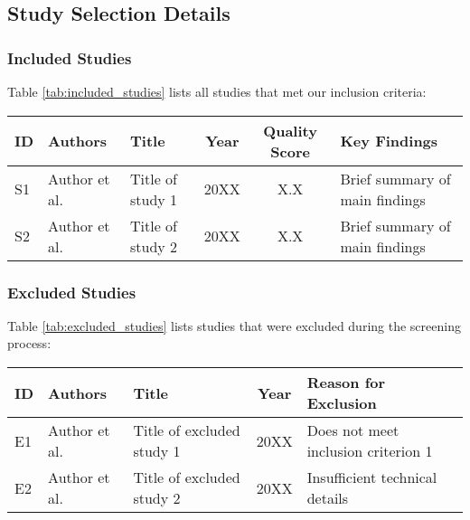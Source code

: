 \subsection{Study Selection Details}
\label{sec:study_selection}

\subsubsection{Included Studies}
Table \ref{tab:included_studies} lists all studies that met our inclusion criteria:

\begin{table*}[htbp!]
    \centering
    \caption{Detailed List of Included Studies}
    \label{tab:included_studies}
    \begin{tabularx}{\textwidth}{|l|l|X|c|c|X|}
        \hline
        \textbf{ID} & \textbf{Authors} & \textbf{Title} & \textbf{Year} & \textbf{Quality Score} & \textbf{Key Findings} \\
        \hline
        S1 & Author et al. & Title of study 1 & 20XX & X.X & Brief summary of main findings \\
        \hline
        S2 & Author et al. & Title of study 2 & 20XX & X.X & Brief summary of main findings \\
        \hline
    \end{tabularx}
\end{table*}

\subsubsection{Excluded Studies}
Table \ref{tab:excluded_studies} lists studies that were excluded during the screening process:

\begin{table*}[htbp!]
    \centering
    \caption{List of Excluded Studies with Reasons}
    \label{tab:excluded_studies}
    \begin{tabularx}{\textwidth}{|l|l|X|c|X|}
        \hline
        \textbf{ID} & \textbf{Authors} & \textbf{Title} & \textbf{Year} & \textbf{Reason for Exclusion} \\
        \hline
        E1 & Author et al. & Title of excluded study 1 & 20XX & Does not meet inclusion criterion 1 \\
        \hline
        E2 & Author et al. & Title of excluded study 2 & 20XX & Insufficient technical details \\
        \hline
    \end{tabularx}
\end{table*}

